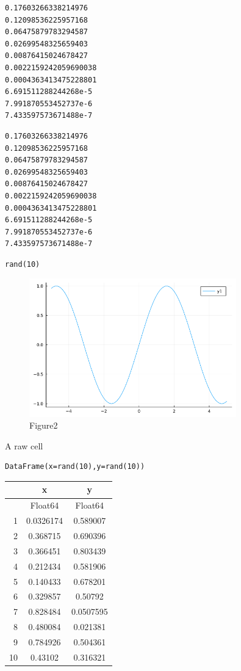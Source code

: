 \begin{verbatim}
0.17603266338214976
0.12098536225957168
0.06475879783294587
0.02699548325659403
0.00876415024678427
0.0022159242059690038
0.0004363413475228801
6.691511288244268e-5
7.991870553452737e-6
7.433597573671488e-7

\end{verbatim}

\begin{verbatim}
0.17603266338214976
0.12098536225957168
0.06475879783294587
0.02699548325659403
0.00876415024678427
0.0022159242059690038
0.0004363413475228801
6.691511288244268e-5
7.991870553452737e-6
7.433597573671488e-7

\end{verbatim}

\begin{lstlisting}[language=JuliaLocal, style=julia]
rand(10)
\end{lstlisting}

\begin{figure}[H]
	 \centering
	\includegraphics[width=0.8\textwidth]{./figures/plotexample.png}
	\caption{Figure2}
	\label{fig:plotexample.png}
\end{figure}
A raw cell
\begin{lstlisting}[language=JuliaLocal, style=julia]
DataFrame(x=rand(10),y=rand(10))
\end{lstlisting}

\begin{tabular}{r|cc}
	& x & y\\
	\hline
	& Float64 & Float64\\
	\hline
	1 & 0.0326174 & 0.589007 \\
	2 & 0.368715 & 0.690396 \\
	3 & 0.366451 & 0.803439 \\
	4 & 0.212434 & 0.581906 \\
	5 & 0.140433 & 0.678201 \\
	6 & 0.329857 & 0.50792 \\
	7 & 0.828484 & 0.0507595 \\
	8 & 0.480084 & 0.021381 \\
	9 & 0.784926 & 0.504361 \\
	10 & 0.43102 & 0.316321 \\
\end{tabular}
